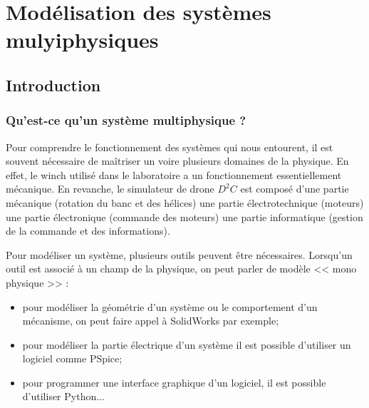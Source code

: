 \setchapterpreamble[u]{\margintoc}
\chapter{Modélisation des systèmes mulyiphysiques}





\section{Introduction}
\subsection{Qu'est-ce qu'un système multiphysique ?}

Pour comprendre le fonctionnement des systèmes qui nous entourent, il est souvent nécessaire de maîtriser un voire plusieurs domaines de la physique. En effet, le winch utilisé dans le laboratoire a un fonctionnement essentiellement mécanique. En revanche, le simulateur de drone $D^2C$ est composé d'une partie mécanique (rotation du banc et des hélices) une partie électrotechnique (moteurs) une partie électronique (commande des moteurs) une partie informatique (gestion de la commande et des informations). 

Pour modéliser un système, plusieurs outils peuvent être nécessaires. Lorsqu'un outil est associé à un champ de la physique, on peut parler de modèle << mono physique >> :
\begin{itemize}
\item pour modéliser la géométrie d'un système ou le comportement d'un mécanisme, on peut faire appel à SolidWorks par exemple;
\item pour modéliser la partie électrique d'un système il est possible d'utiliser un logiciel comme PSpice;
\item pour programmer une interface graphique d'un logiciel, il est possible d'utiliser Python...
\end{itemize}

